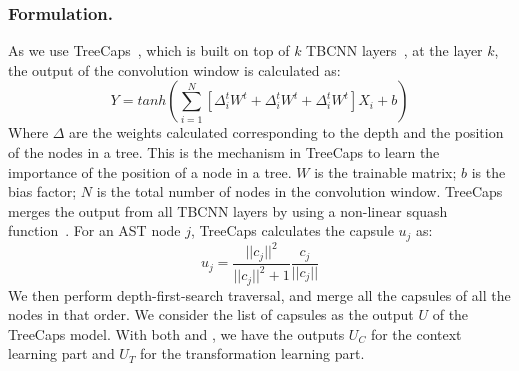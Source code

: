 \subsubsection*{\bf Formulation.}
As we use TreeCaps~\cite{bui2021treecaps}, which is built on top of
$k$ TBCNN layers~\cite{mou2014tbcnn}, at the layer $k$, the output of
the convolution window is calculated as:
\begin{equation}\label{eq:treecaps}
	Y = tanh(\sum_{i=1}^{N}[\Delta^t_iW^t + \Delta^t_iW^t + \Delta^t_iW^t]X_i + b)
\end{equation}
Where $\Delta$ are the weights calculated corresponding to the depth
and the position of the nodes in a tree. This is the mechanism in
TreeCaps to learn the importance of the position of a node in a
tree. $W$ is the trainable matrix; $b$ is the bias factor; $N$ is the
total number of nodes in the convolution window. TreeCaps merges the
output from all TBCNN layers by using a non-linear squash
function~\cite{sabour2017dynamic}. For an AST node $j$, TreeCaps
calculates the capsule $u_j$ as:
\begin{equation}\label{eq:2}
	u_j = \frac{||c_j||^2}{||c_j||^2+1}\frac{c_j}{||c_j||}
\end{equation}
We then perform depth-first-search traversal, and merge all the
capsules of all the nodes in that order. We consider the list of
capsules as the output $U$ of the TreeCaps model. With both
 and , we have the outputs $U_C$ for the context
learning part and $U_T$ for the transformation learning part.

